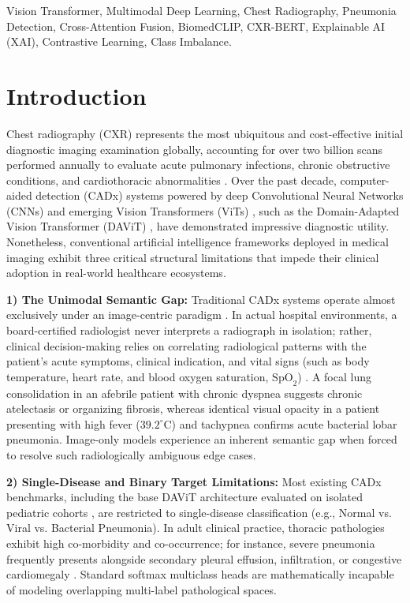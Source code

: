 \documentclass[conference]{IEEEtran}
\begin{document}
\begin{IEEEkeywords}
Vision Transformer, Multimodal Deep Learning, Chest Radiography, Pneumonia Detection, Cross-Attention Fusion, BiomedCLIP, CXR-BERT, Explainable AI (XAI), Contrastive Learning, Class Imbalance.
\end{IEEEkeywords}

\section{Introduction}
Chest radiography (CXR) represents the most ubiquitous and cost-effective initial diagnostic imaging examination globally, accounting for over two billion scans performed annually to evaluate acute pulmonary infections, chronic obstructive conditions, and cardiothoracic abnormalities \cite{who2016}. Over the past decade, computer-aided detection (CADx) systems powered by deep Convolutional Neural Networks (CNNs) \cite{litjens2017} and emerging Vision Transformers (ViTs) \cite{dosovitskiy2021}, such as the Domain-Adapted Vision Transformer (DAViT) \cite{davit2024}, have demonstrated impressive diagnostic utility. Nonetheless, conventional artificial intelligence frameworks deployed in medical imaging exhibit three critical structural limitations that impede their clinical adoption in real-world healthcare ecosystems.

\textbf{1) The Unimodal Semantic Gap:} Traditional CADx systems operate almost exclusively under an image-centric paradigm \cite{rajpurkar2017}. In actual hospital environments, a board-certified radiologist never interprets a radiograph in isolation; rather, clinical decision-making relies on correlating radiological patterns with the patient's acute symptoms, clinical indication, and vital signs (such as body temperature, heart rate, and blood oxygen saturation, $\text{SpO}_2$) \cite{irvin2019}. A focal lung consolidation in an afebrile patient with chronic dyspnea suggests chronic atelectasis or organizing fibrosis, whereas identical visual opacity in a patient presenting with high fever ($39.2^\circ\text{C}$) and tachypnea confirms acute bacterial lobar pneumonia. Image-only models experience an inherent semantic gap when forced to resolve such radiologically ambiguous edge cases.

\textbf{2) Single-Disease and Binary Target Limitations:} Most existing CADx benchmarks, including the base DAViT architecture evaluated on isolated pediatric cohorts \cite{davit2024, kermany2018}, are restricted to single-disease classification (e.g., Normal vs. Viral vs. Bacterial Pneumonia). In adult clinical practice, thoracic pathologies exhibit high co-morbidity and co-occurrence; for instance, severe pneumonia frequently presents alongside secondary pleural effusion, infiltration, or congestive cardiomegaly \cite{vandeleur2023}. Standard softmax multiclass heads are mathematically incapable of modeling overlapping multi-label pathological spaces.
\end{document}
